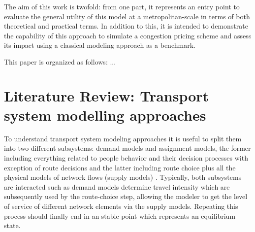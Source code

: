 \documentclass[Journal,letterpaper]{ascelike-new}
\begin{document}
The aim of this work is twofold: from one part, it represents an entry point to evaluate the general utility of this model at a metropolitan-scale in terms of both theoretical and practical terms. In addition to this, it is intended to demonstrate the capability of this approach to simulate a congestion pricing scheme and assess its impact using a classical modeling approach as a benchmark.

This paper is organized as follows: ...

\section{Literature Review: Transport system modelling approaches}
\label{sec:literature_review}
To understand transport system modeling approaches it is useful to split them into two different subsystems: demand models and assignment models, the former including everything related to people behavior and their decision processes with exception of route decisions and the latter including route choice plus all the physical models of network flows (supply models) \citep{flugel2014evaluation}. Typically, both subsystems are interacted such as demand models determine travel intensity which are subsequently used by the route-choice step, allowing the modeler to get the level of service of different network elements via the supply models. Repeating this process should finally end in an stable point which represents an equilibrium state.
\end{document}
